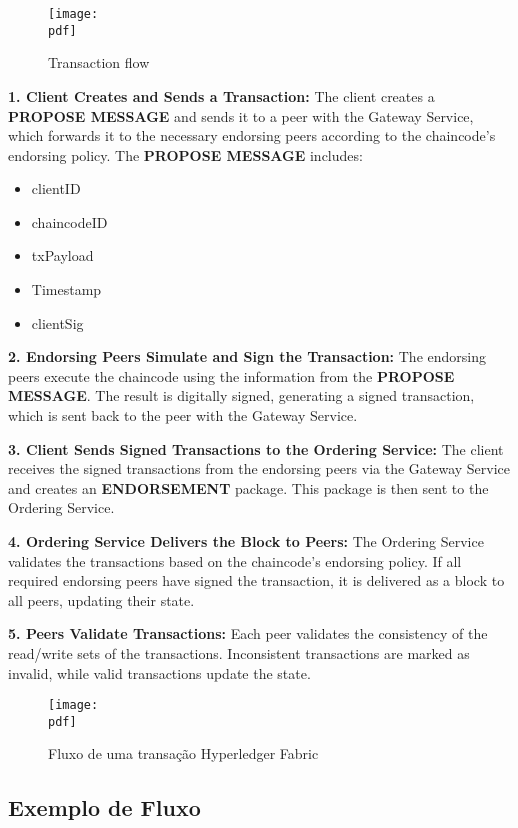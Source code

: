 \documentclass[letterpaper,11pt,leqno]{article}
\newcommand{\pdf}{figures/figures}
\begin{document}
\begin{figure}[H]
	{\texttt{[image: \\pdf]}}
	\caption{Transaction flow}
	\label{f:figure1}\end{figure}

\textbf{1. Client Creates and Sends a Transaction:} The client creates a
\textbf{PROPOSE MESSAGE} and sends it to a peer with the Gateway Service, which
forwards it to the necessary endorsing peers according to the chaincode's
endorsing policy. The \textbf{PROPOSE MESSAGE} includes:
\begin{itemize}
	\item clientID
	\item chaincodeID
	\item txPayload
	\item Timestamp
	\item clientSig
\end{itemize}

\textbf{2. Endorsing Peers Simulate and Sign the Transaction:} The endorsing
peers execute the chaincode using the information from the \textbf{PROPOSE
	MESSAGE}. The result is digitally signed, generating a signed transaction, which
is sent back to the peer with the Gateway Service.

\textbf{3. Client Sends Signed Transactions to the Ordering Service:} The client
receives the signed transactions from the endorsing peers via the Gateway
Service and creates an \textbf{ENDORSEMENT} package. This package is then sent
to the Ordering Service.

\textbf{4. Ordering Service Delivers the Block to Peers:} The Ordering Service
validates the transactions based on the chaincode's endorsing policy. If all
required endorsing peers have signed the transaction, it is delivered as a block
to all peers, updating their state.

\newpage

\textbf{5. Peers Validate Transactions:} Each peer validates the consistency of
the read/write sets of the transactions. Inconsistent transactions are marked as
invalid, while valid transactions update the state.

\begin{figure}[H]
	{\texttt{[image: \\pdf]}}
	\caption{Fluxo de uma transação Hyperledger Fabric}
	\label{f:figure2}\end{figure}

\subsection{Exemplo de Fluxo}
\end{document}
